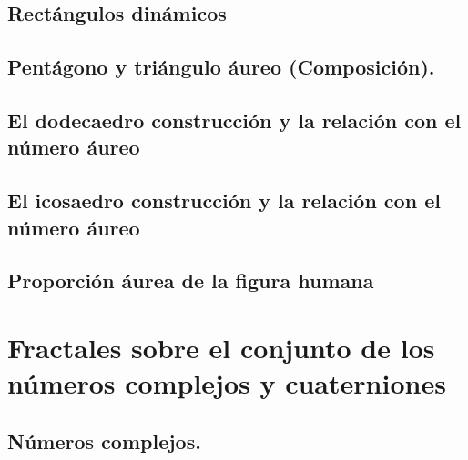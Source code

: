 \documentclass[
  11pt,
]{krantz}
\theoremstyle{definition}
\theoremstyle{definition}
\theoremstyle{definition}
\theoremstyle{definition}
\theoremstyle{remark}
\begin{document}
\hypertarget{rectuxe1ngulos-dinuxe1micos}{%
\section{Rectángulos dinámicos}\label{rectuxe1ngulos-dinuxe1micos}}

\hypertarget{pentuxe1gono-y-triuxe1ngulo-uxe1ureo-composiciuxf3n.}{%
\section{Pentágono y triángulo áureo (Composición).}\label{pentuxe1gono-y-triuxe1ngulo-uxe1ureo-composiciuxf3n.}}

\hypertarget{el-dodecaedro-construcciuxf3n-y-la-relaciuxf3n-con-el-nuxfamero-uxe1ureo}{%
\section{El dodecaedro construcción y la relación con el número áureo}\label{el-dodecaedro-construcciuxf3n-y-la-relaciuxf3n-con-el-nuxfamero-uxe1ureo}}

\hypertarget{el-icosaedro-construcciuxf3n-y-la-relaciuxf3n-con-el-nuxfamero-uxe1ureo}{%
\section{El icosaedro construcción y la relación con el número áureo}\label{el-icosaedro-construcciuxf3n-y-la-relaciuxf3n-con-el-nuxfamero-uxe1ureo}}

\hypertarget{proporciuxf3n-uxe1urea-de-la-figura-humana}{%
\section{Proporción áurea de la figura humana}\label{proporciuxf3n-uxe1urea-de-la-figura-humana}}

\hypertarget{fractales-sobre-el-conjunto-de-los-nuxfameros-complejos-y-cuaterniones}{%
\chapter{Fractales sobre el conjunto de los números complejos y cuaterniones}\label{fractales-sobre-el-conjunto-de-los-nuxfameros-complejos-y-cuaterniones}}

\hypertarget{nuxfameros-complejos.}{%
\section{Números complejos.}\label{nuxfameros-complejos.}}
\end{document}
